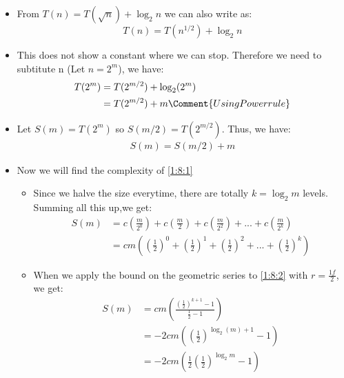 \documentclass{article}
\begin{document}
	\begin{itemize}
		\item From \(T(n) = T(\sqrt{n}) + \log_2n\) we can also write as:
		\[T(n) = T(n^{1/2}) + \log_2n\]
		\item This does not show a constant where we can stop. Therefore we need to subtitute n (Let \(n = 2^m\)), we have:
		\begin{align}
			T(2^m) &= T(2^{m/2}) + \log_2(2^m) \\
		           &= T(2^{m/2}) + m \Comment{Using Power rule} \\
		\end{align}
		\item Let \(S(m) = T(2^m)\) so \(S(m/2) = T(2^{m/2})\). Thus, we have:
		\begin{align}
			S(m) = S(m/2) + m \label{1:8:1}
		\end{align}
		\item Now we will find the complexity of \eqref{1:8:1}
		\begin{itemize}
			\item Since we halve the size everytime, there are totally \(k = \log_2m\) levels. Summing all this up,we get:
			\begin{align}
				S(m) &= c(\frac{m}{2^0}) + c(\frac{m}{2}) + c(\frac{m}{2^2}) + ... + c(\frac{m}{2^k}) \\
				     &= cm\left((\frac{1}{2})^0 + (\frac{1}{2})^1 + (\frac{1}{2})^2 + ... + (\frac{1}{2})^k\right) \label{1:8:2}
			\end{align}
			\item When we apply the bound on the geometric series to \eqref{1:8:2} with \( r = \frac{1f}{2} \), we get:
			\begin{align}
				S(m) &= cm\left(\frac{(\frac{1}{2})^{k + 1} - 1}{\frac{1}{2} - 1}\right) \\
				     &= -2cm\left(\left(\frac{1}{2}\right)^{\log_2(m) + 1} - 1\right) \\
					 &= -2cm\left(\frac{1}{2}\left(\frac{1}{2}\right)^{\log_2m} - 1\right) \\

\end{align}
\end{itemize}
\end{itemize}
\end{document}
